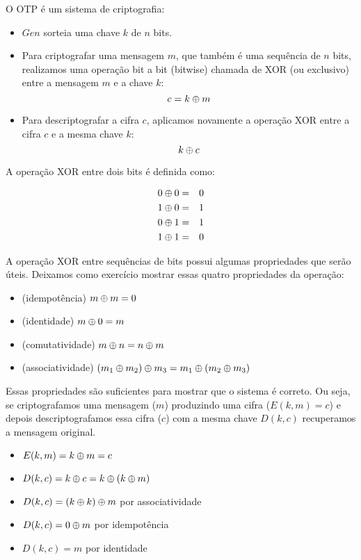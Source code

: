 O OTP é um sistema de criptografia:
\begin{itemize}
\item $Gen$ sorteia uma chave $k$ de $n$ bits.
\item Para criptografar uma mensagem $m$, que também é uma sequência de $n$ bits, realizamos uma operação bit a bit (bitwise) chamada de XOR (ou exclusivo) entre a mensagem $m$ e a chave $k$:
  \begin{displaymath}
    c = k \oplus m
  \end{displaymath}
\item Para descriptografar a cifra $c$, aplicamos novamente a operação XOR entre a cifra $c$ e a mesma chave $k$:
  \begin{displaymath}
    k \oplus c
  \end{displaymath}
\end{itemize}

A operação XOR entre dois bits é definida como:

\begin{eqnarray*}
  0 \oplus 0 & = & 0\\
  1 \oplus 0 & = & 1\\
  0 \oplus 1 & = & 1\\
  1 \oplus 1 & = & 0
\end{eqnarray*}

A operação XOR entre sequências de bits possui algumas propriedades que serão úteis.
Deixamos como exercício mostrar essas quatro propriedades da operação:

\begin{itemize}
\item (idempotência) $m \oplus m = 0$
\item (identidade) $m \oplus 0 = m$
\item (comutatividade) $m \oplus n = n \oplus m$
\item (associatividade) $(m_1 \oplus m_2) \oplus m_3 = m_1 \oplus (m_2 \oplus m_3)$
\end{itemize}

Essas propriedades são suficientes para mostrar que o sistema é correto.
Ou seja, se criptografamos uma mensagem ($m$) produzindo uma cifra ($E(k,m) = c$) e depois descriptografamos essa cifra ($c$) com a mesma chave $D(k,c)$ recuperamos a mensagem original.

\begin{itemize}
\item $E(k,m) = k \oplus m = c$
\item $D(k,c) = k \oplus c = k \oplus (k \oplus m)$
\item $D(k,c) = (k \oplus k) \oplus m$ por associatividade
\item $D(k,c) = 0 \oplus m$ por idempotência
\item $D(k,c) = m$ por identidade
\end{itemize}

